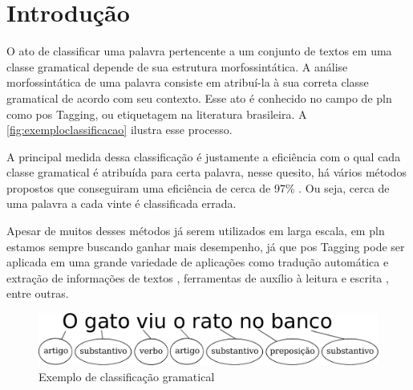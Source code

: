 \chapter{Introdução}\label{introducao}

O ato de classificar uma palavra pertencente a um conjunto de textos em uma classe gramatical depende de sua estrutura morfossintática. A análise morfossintática de uma palavra consiste em atribuí-la à sua correta classe gramatical de acordo com seu contexto. Esse ato é conhecido no campo de \ac{pln} como \ac{pos} Tagging, ou etiquetagem na literatura brasileira. A \autoref{fig:exemploclassificacao} ilustra esse processo. 


A principal medida dessa classificação é justamente a eficiência com o qual cada classe gramatical é atribuída para certa palavra, nesse quesito, há vários métodos propostos que conseguiram uma eficiência de cerca de 97\% \cite{dos2014training, collobert2011deep, fonseca2015evaluating}. Ou seja, cerca de uma palavra a cada vinte é classificada errada. 

Apesar de muitos desses métodos já serem utilizados em larga escala, em \ac{pln} estamos sempre buscando ganhar mais desempenho, já que \ac{pos} Tagging pode ser aplicada em uma grande variedade de aplicações como tradução automática e extração de informações de textos \cite{manning1999foundations}, ferramentas de auxílio à leitura e escrita \cite{marquiafavel2010processo}, entre outras.

\begin{figure}[htb]
  \caption{Exemplo de classificação gramatical}\label{fig:exemploclassificacao}
  \begin{center}
      \includegraphics[scale=0.75]{img/exemploclassificacao.pdf}
  \end{center}
\end{figure}

